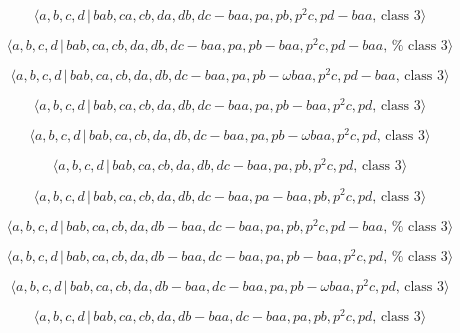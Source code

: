 \documentclass[10pt]{article}
\begin{document}
\begin{equation}
\langle a,b,c,d\,|\,bab,ca,cb,da,db,dc-baa,pa,pb,p^2c,pd-baa,\,\text{class }%
3\rangle  \tag{7.3688}
\end{equation}

\begin{equation}
\langle a,b,c,d\,|\,bab,ca,cb,da,db,dc-baa,pa,pb-baa,p^2c,pd-baa,\,\text{%
class }3\rangle  \tag{7.3689}
\end{equation}

\begin{equation}
\langle a,b,c,d\,|\,bab,ca,cb,da,db,dc-baa,pa,pb-\omega baa,p^{2}c,pd-baa,\,%
\text{class }3\rangle  \tag{7.3690}
\end{equation}

\begin{equation}
\langle a,b,c,d\,|\,bab,ca,cb,da,db,dc-baa,pa,pb-baa,p^2c,pd,\,\text{class }%
3\rangle  \tag{7.3691}
\end{equation}

\begin{equation}
\langle a,b,c,d\,|\,bab,ca,cb,da,db,dc-baa,pa,pb-\omega baa,p^{2}c,pd,\,%
\text{class }3\rangle  \tag{7.3692}
\end{equation}

\begin{equation}
\langle a,b,c,d\,|\,bab,ca,cb,da,db,dc-baa,pa,pb,p^2c,pd,\,\text{class }%
3\rangle  \tag{7.3693}
\end{equation}

\begin{equation}
\langle a,b,c,d\,|\,bab,ca,cb,da,db,dc-baa,pa-baa,pb,p^2c,pd,\,\text{class }%
3\rangle  \tag{7.3694}
\end{equation}

\begin{equation}
\langle a,b,c,d\,|\,bab,ca,cb,da,db-baa,dc-baa,pa,pb,p^2c,pd-baa,\,\text{%
class }3\rangle  \tag{7.3695}
\end{equation}

\begin{equation}
\langle a,b,c,d\,|\,bab,ca,cb,da,db-baa,dc-baa,pa,pb-baa,p^2c,pd,\,\text{%
class }3\rangle  \tag{7.3696}
\end{equation}

\begin{equation}
\langle a,b,c,d\,|\,bab,ca,cb,da,db-baa,dc-baa,pa,pb-\omega baa,p^{2}c,pd,\,%
\text{class }3\rangle  \tag{7.3697}
\end{equation}

\begin{equation}
\langle a,b,c,d\,|\,bab,ca,cb,da,db-baa,dc-baa,pa,pb,p^2c,pd,\,\text{class }%
3\rangle  \tag{7.3698}
\end{equation}
\end{document}
